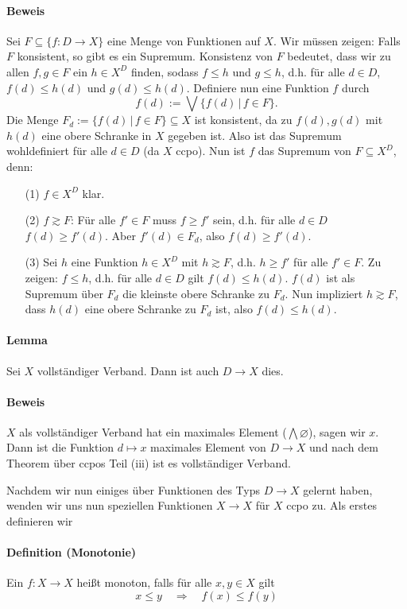 \documentclass[a4paper,11pt,abstracton]{scrartcl}
\begin{document}
\paragraph{Beweis} Sei $F \subseteq \{ f \colon D \to X\}$ eine Menge von Funktionen auf $X$. Wir müssen zeigen: Falls $F$ konsistent, so gibt es ein Supremum. Konsistenz von $F$ bedeutet, dass wir zu allen $f,g\in F$ ein $h \in X^D$ finden, sodass $f \leq h$ und $g \leq h$, d.h. für alle $d \in D$, $f(d) \leq h(d)$ und $g(d) \leq h(d)$. Definiere nun eine Funktion $f$ durch
\begin{equation}
 f(d) := \bigvee \{ f(d) \, | \, f \in F \}.
\end{equation}
Die Menge $F_d := \{ f(d) \, | \, f \in F \} \subseteq X$ ist konsistent, da zu $f(d), g(d)$ mit $h(d)$ eine obere Schranke in $X$ gegeben ist. Also ist das Supremum wohldefiniert für alle $d \in D$ (da $X$ ccpo). Nun ist $f$ das Supremum von $F \subseteq X^D$, denn:
\begin{enumerate}
 \item[(1)] $f \in X^D$ klar.
 \item[(2)] $f \gtrsim F$: Für alle $f' \in F$ muss $f \geq f'$ sein, d.h. für alle $d \in D$ $f(d) \geq f'(d)$. Aber $f'(d) \in F_d$, also $f(d) \geq f'(d)$.
 \item[(3)] Sei $h$ eine Funktion $h \in X^D$ mit $h \gtrsim F$, d.h. $h \geq f'$ für alle $f' \in F$. Zu zeigen: $f \leq h$, d.h. für alle $d\in D$ gilt $f(d) \leq h(d)$. $f(d)$ ist als Supremum über $F_d$ die kleinste obere Schranke zu $F_d$. Nun impliziert $h \gtrsim F$, dass $h(d)$ eine obere Schranke zu $F_d$ ist, also $ f(d) \leq h(d)$.
\end{enumerate}
\paragraph{Lemma} Sei $X$ vollständiger Verband. Dann ist auch $D \to X$ dies.
\paragraph{Beweis} $X$ als vollständiger Verband hat ein maximales Element ($\bigwedge \varnothing$), sagen wir $x$. Dann ist die Funktion $d \mapsto x$ maximales Element von $D \to X$ und nach dem Theorem über ccpos Teil (iii) ist es vollständiger Verband.

Nachdem wir nun einiges über Funktionen des Typs $D \to X$ gelernt haben, wenden wir uns nun speziellen Funktionen $X\to X$ für $X$ ccpo zu. Als erstes definieren wir
\paragraph{Definition (Monotonie)} Ein $f\colon X \to X$ heißt monoton, falls für alle $x,y \in X$ gilt
\begin{equation}
 x \leq y \quad \Rightarrow \quad f(x) \leq f(y)
\end{equation}
\end{document}
